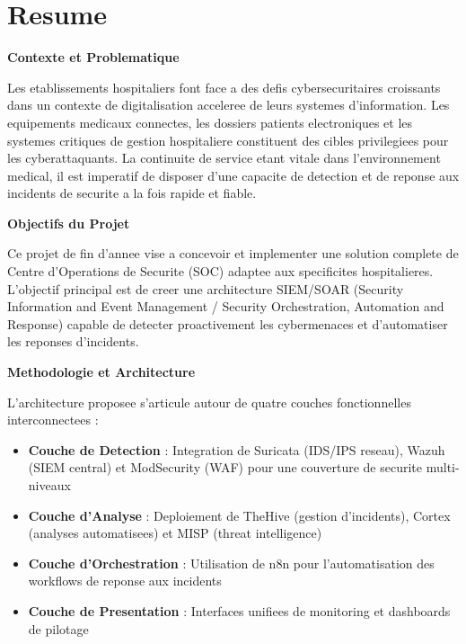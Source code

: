 \chapter*{Resume}

\vspace{1cm}

\textbf{Contexte et Problematique}

Les etablissements hospitaliers font face a des defis cybersecuritaires croissants dans un contexte de digitalisation acceleree de leurs systemes d'information. Les equipements medicaux connectes, les dossiers patients electroniques et les systemes critiques de gestion hospitaliere constituent des cibles privilegiees pour les cyberattaquants. La continuite de service etant vitale dans l'environnement medical, il est imperatif de disposer d'une capacite de detection et de reponse aux incidents de securite a la fois rapide et fiable.

\vspace{0.5cm}

\textbf{Objectifs du Projet}

Ce projet de fin d'annee vise a concevoir et implementer une solution complete de Centre d'Operations de Securite (SOC) adaptee aux specificites hospitalieres. L'objectif principal est de creer une architecture SIEM/SOAR (Security Information and Event Management / Security Orchestration, Automation and Response) capable de detecter proactivement les cybermenaces et d'automatiser les reponses d'incidents.

\vspace{0.5cm}

\textbf{Methodologie et Architecture}

L'architecture proposee s'articule autour de quatre couches fonctionnelles interconnectees :

\begin{itemize}
    \item \textbf{Couche de Detection} : Integration de Suricata (IDS/IPS reseau), Wazuh (SIEM central) et ModSecurity (WAF) pour une couverture de securite multi-niveaux
    \item \textbf{Couche d'Analyse} : Deploiement de TheHive (gestion d'incidents), Cortex (analyses automatisees) et MISP (threat intelligence)
    \item \textbf{Couche d'Orchestration} : Utilisation de n8n pour l'automatisation des workflows de reponse aux incidents
    \item \textbf{Couche de Presentation} : Interfaces unifiees de monitoring et dashboards de pilotage
\end{itemize}

